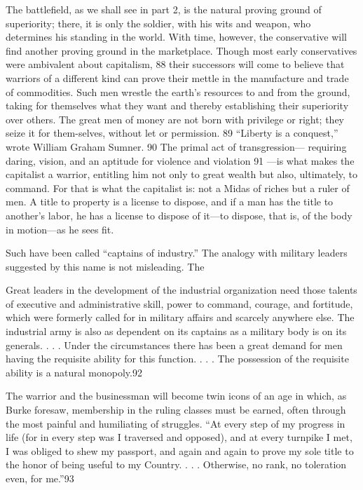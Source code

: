  \par 
The battlefield, as we shall see in part 2, is the natural proving ground of superiority; there, it is only the soldier, with his wits and weapon, who determines his standing in the world. With time, however, the conservative will find another proving ground in the marketplace. Though most early conservatives were ambivalent about capitalism, {\color{blue}88} their successors will come to believe that warriors of a different kind can prove their mettle in the manufacture and trade of commodities. Such men wrestle the earth’s resources to and from the ground, taking for themselves what they want and thereby establishing their superiority over others. The great men of money are not born with privilege or right; they seize it for them-selves, without let or permission. {\color{blue}89} “Liberty is a conquest,” wrote William Graham Sumner. {\color{blue}90} The primal act of transgression— requiring daring, vision, and an aptitude for violence and violation {\color{blue}91} —is what makes the capitalist a warrior, entitling him not only to great wealth but also, ultimately, to command. For that is what the capitalist is: not a Midas of riches but a ruler of men. A title to property is a license to dispose, and if a man has the title to another’s labor, he has a license to dispose of it—to dispose, that is, of the body in motion—as he sees fit.
 \par 
Such have been called “captains of industry.” The analogy with military leaders suggested by this name is not misleading. The
 \par 
Great leaders in the development of the industrial organization need those talents of executive and administrative skill, power to command, courage, and fortitude, which were formerly called for in military affairs and scarcely anywhere else. The industrial army is also as dependent on its captains as a military body is on its generals. . . . Under the circumstances there has been a great demand for men having the requisite ability for this function. . . . The possession of the requisite ability is a natural monopoly.{\color{blue}92}
 \par 
The warrior and the businessman will become twin icons of an age in which, as Burke foresaw, membership in the ruling classes must be earned, often through the most painful and humiliating of struggles. “At every step of my progress in life (for in every step was I traversed and opposed), and at every turnpike I met, I was obliged to shew my passport, and again and again to prove my sole title to the honor of being useful to my Country. . . . Otherwise, no rank, no toleration even, for me.”{\color{blue}93}
